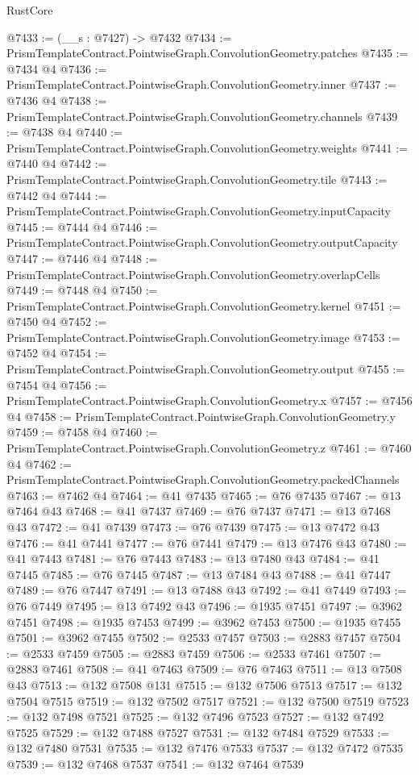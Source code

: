\begin{lexlean}{RustCore}
\begin{coremodule}
@7433 := (__s : @7427) -> @7432
@7434 := PrismTemplateContract.PointwiseGraph.ConvolutionGeometry.patches
@7435 := @7434 @4
@7436 := PrismTemplateContract.PointwiseGraph.ConvolutionGeometry.inner
@7437 := @7436 @4
@7438 := PrismTemplateContract.PointwiseGraph.ConvolutionGeometry.channels
@7439 := @7438 @4
@7440 := PrismTemplateContract.PointwiseGraph.ConvolutionGeometry.weights
@7441 := @7440 @4
@7442 := PrismTemplateContract.PointwiseGraph.ConvolutionGeometry.tile
@7443 := @7442 @4
@7444 := PrismTemplateContract.PointwiseGraph.ConvolutionGeometry.inputCapacity
@7445 := @7444 @4
@7446 := PrismTemplateContract.PointwiseGraph.ConvolutionGeometry.outputCapacity
@7447 := @7446 @4
@7448 := PrismTemplateContract.PointwiseGraph.ConvolutionGeometry.overlapCells
@7449 := @7448 @4
@7450 := PrismTemplateContract.PointwiseGraph.ConvolutionGeometry.kernel
@7451 := @7450 @4
@7452 := PrismTemplateContract.PointwiseGraph.ConvolutionGeometry.image
@7453 := @7452 @4
@7454 := PrismTemplateContract.PointwiseGraph.ConvolutionGeometry.output
@7455 := @7454 @4
@7456 := PrismTemplateContract.PointwiseGraph.ConvolutionGeometry.x
@7457 := @7456 @4
@7458 := PrismTemplateContract.PointwiseGraph.ConvolutionGeometry.y
@7459 := @7458 @4
@7460 := PrismTemplateContract.PointwiseGraph.ConvolutionGeometry.z
@7461 := @7460 @4
@7462 := PrismTemplateContract.PointwiseGraph.ConvolutionGeometry.packedChannels
@7463 := @7462 @4
@7464 := @41 @7435
@7465 := @76 @7435
@7467 := @13 @7464 @43
@7468 := @41 @7437
@7469 := @76 @7437
@7471 := @13 @7468 @43
@7472 := @41 @7439
@7473 := @76 @7439
@7475 := @13 @7472 @43
@7476 := @41 @7441
@7477 := @76 @7441
@7479 := @13 @7476 @43
@7480 := @41 @7443
@7481 := @76 @7443
@7483 := @13 @7480 @43
@7484 := @41 @7445
@7485 := @76 @7445
@7487 := @13 @7484 @43
@7488 := @41 @7447
@7489 := @76 @7447
@7491 := @13 @7488 @43
@7492 := @41 @7449
@7493 := @76 @7449
@7495 := @13 @7492 @43
@7496 := @1935 @7451
@7497 := @3962 @7451
@7498 := @1935 @7453
@7499 := @3962 @7453
@7500 := @1935 @7455
@7501 := @3962 @7455
@7502 := @2533 @7457
@7503 := @2883 @7457
@7504 := @2533 @7459
@7505 := @2883 @7459
@7506 := @2533 @7461
@7507 := @2883 @7461
@7508 := @41 @7463
@7509 := @76 @7463
@7511 := @13 @7508 @43
@7513 := @132 @7508 @131
@7515 := @132 @7506 @7513
@7517 := @132 @7504 @7515
@7519 := @132 @7502 @7517
@7521 := @132 @7500 @7519
@7523 := @132 @7498 @7521
@7525 := @132 @7496 @7523
@7527 := @132 @7492 @7525
@7529 := @132 @7488 @7527
@7531 := @132 @7484 @7529
@7533 := @132 @7480 @7531
@7535 := @132 @7476 @7533
@7537 := @132 @7472 @7535
@7539 := @132 @7468 @7537
@7541 := @132 @7464 @7539

\end{coremodule}
\end{lexlean}
